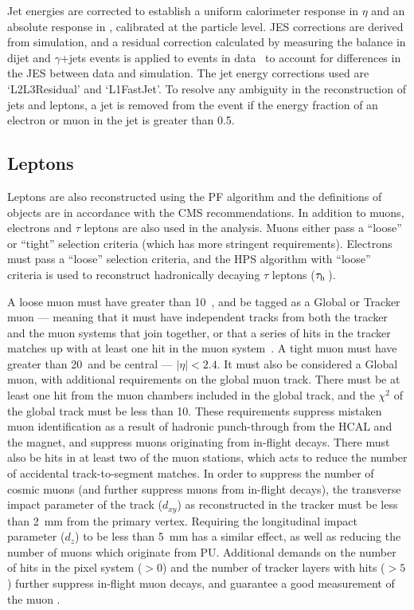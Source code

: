 Jet energies are corrected to establish a uniform calorimeter 
response in $\eta$ and an absolute response in \pt, calibrated at 
the particle level.  
\ac{JES} corrections are derived from simulation, and a residual correction calculated by measuring the \pt balance in dijet and $\gamma$+jets events is applied to events in data~\cite{JETJINST} to account for differences in the \ac{JES} between data and simulation.
The jet energy corrections used are `L2L3Residual' and `L1FastJet'.
To resolve any ambiguity in the reconstruction of jets and leptons, a jet is removed from the event if the energy fraction of an electron or muon in the jet is greater than 0.5.



\subsection{Leptons}
\label{sec:objectReco:lep}

Leptons are also reconstructed using the \ac{PF} algorithm and the definitions of objects are in accordance with the \ac{CMS} recommendations.
In addition to muons, electrons and $\tau$ leptons are also used in the analysis.
Muons either pass a ``loose'' or ``tight'' selection criteria (which has more stringent requirements). 
Electrons must pass a ``loose'' selection criteria, and the \ac{HPS} algorithm with ``loose'' criteria is used to reconstruct hadronically decaying $\tau$ leptons ($\tau_\mathrm{h}\,$).

A loose muon must have \pt greater than 10~\GeV, and be tagged as a Global or Tracker muon --- meaning that it must
have independent tracks from both the tracker and the muon systems that join together, or that a series of hits in the tracker matches up with at least one hit in the muon system~\cite{CMS-PAPER-MUO-10-004}. 
%
A tight muon must have \pt greater than 20~\GeV and be central --- $|\eta|<2.4$. 
It must also be considered a Global muon, with additional requirements on the global muon track. 
There must be at least one hit from the muon chambers included in the global track, and the $\chi^{2}$ of the global track must be less than 10. These requirements suppress mistaken muon identification as a result of hadronic punch-through from the \ac{HCAL} and the magnet, and suppress muons originating from in-flight decays.
There must also be hits in at least two of the muon stations, which acts to reduce the number of accidental track-to-segment matches.
In order to suppress the number of cosmic muons (and further suppress muons from in-flight decays), the transverse impact parameter of the track ($d_{xy}$) as reconstructed in the tracker must be less than 2~mm from the primary vertex. 
Requiring the longitudinal impact parameter ($d_{z}$) to be less than 5~mm has a similar effect, as well as reducing the number of muons which originate from \ac{PU}.
Additional demands on the number of hits in the pixel system ($>0$) and the number of tracker layers with hits ($>5$) further suppress in-flight muon decays, and guarantee a good measurement of the muon \pt.

